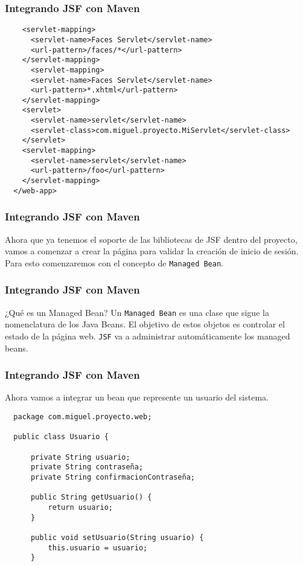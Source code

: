 \documentclass{beamer}
\begin{document}
\begin{frame}[fragile]
  \frametitle{Integrando JSF con Maven}
  \begin{verbatim}
    <servlet-mapping>
      <servlet-name>Faces Servlet</servlet-name>
      <url-pattern>/faces/*</url-pattern>
    </servlet-mapping>
      <servlet-mapping>
      <servlet-name>Faces Servlet</servlet-name>
      <url-pattern>*.xhtml</url-pattern>
    </servlet-mapping>
    <servlet>
      <servlet-name>servlet</servlet-name>
      <servlet-class>com.miguel.proyecto.MiServlet</servlet-class>
    </servlet>
    <servlet-mapping>
      <servlet-name>servlet</servlet-name>
      <url-pattern>/foo</url-pattern>
    </servlet-mapping>
  </web-app>
  \end{verbatim}
\end{frame}

\begin{frame}[fragile]
  \frametitle{Integrando JSF con Maven}
  Ahora que ya tenemos el soporte de las bibliotecas de JSF dentro del
  proyecto, vamos a comenzar a crear la página para validar la
  creación de inicio de sesión. Para esto comenzaremos con el concepto
  de \texttt{Managed Bean}.
\end{frame}

\begin{frame}[fragile]
  \frametitle{Integrando JSF con Maven}
    \begin{block}{¿Qué es un Managed Bean?}
    Un \texttt{Managed Bean} es una clase que sigue la nomenclatura de
    los Java Beans. El objetivo de estos objetos es controlar el estado de
    la página web. \texttt{JSF} va a administrar automáticamente los
    managed beans.
  \end{block}
\end{frame}

\begin{frame}[fragile]
  \frametitle{Integrando JSF con Maven}
  Ahora vamos a integrar un bean que represente un usuario del
  sistema.

  \begin{verbatim}
  package com.miguel.proyecto.web;

  public class Usuario {

      private String usuario;
      private String contraseña;
      private String confirmacionContraseña;

      public String getUsuario() {
          return usuario;
      }

      public void setUsuario(String usuario) {
          this.usuario = usuario;
      }

  \end{verbatim}
\end{frame}
\end{document}

